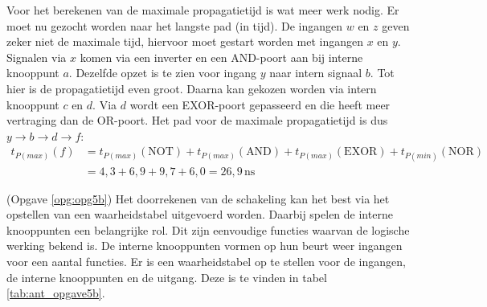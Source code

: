 \documentclass[a4paper,12pt,addpoints,fleqn,dutch,concept]{tisdexam}
\begin{document}
\begin{questions}
Voor het berekenen van de maximale propagatietijd is wat meer werk nodig. Er moet nu
gezocht worden naar het langste pad (in tijd). De ingangen $w$ en $z$ geven zeker niet
de maximale tijd, hiervoor moet gestart worden met ingangen $x$ en $y$. Signalen via
$x$ komen via een inverter en een AND-poort aan bij interne knooppunt $a$. Dezelfde
opzet is te zien voor ingang $y$ naar intern signaal $b$. Tot hier is de propagatietijd even
groot. Daarna kan gekozen worden via intern knooppunt $c$ en $d$. Via $d$ wordt een
EXOR-poort gepasseerd en die heeft meer vertraging dan de OR-poort. Het pad voor de maximale
propagatietijd is dus $y \rightarrow b \rightarrow d \rightarrow f$:
\begin{equation*}
\begin{split}
t_{P(max)}(f) &= t_{P(max)}(\text{NOT}) + t_{P(max)}(\text{AND}) + t_{P(max)}(\text{EXOR}) + t_{P(min)}(\text{NOR}) \\
              &= 4,3 + 6,9 + 9,7 + 6,0 = 26,9 \, \textrm{ns}
\end{split}
\end{equation*}

(Opgave \ref{opg:opg5b}) Het doorrekenen van de schakeling kan het best via het opstellen
van een waarheidstabel uitgevoerd worden. Daarbij spelen de interne knooppunten een
belangrijke rol. Dit zijn eenvoudige functies waarvan de logische werking bekend is.
De interne knooppunten vormen op hun beurt weer ingangen voor een aantal functies.
Er is een waarheidstabel op te stellen voor de ingangen, de interne knooppunten en de
uitgang. Deze is te vinden in tabel \ref{tab:ant_opgave5b}.


\end{questions}
\end{document}
